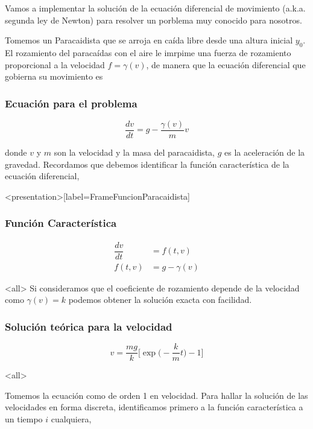 
Vamos a implementar la solución de la ecuación diferencial de movimiento 
(a.k.a. segunda ley de Newton) para resolver un porblema muy conocido para 
nosotros. 

Tomemos un Paracaidista que se arroja en caída libre desde una altura inicial $y_0$.
El rozamiento del paracaídas con el aire le imrpime una fuerza de rozamiento proporcional 
a la velocidad $f = \gamma (v)$, de manera que la ecuación diferencial que gobierna su movimiento es

\mode*

\begin{frame}[label=FrameEcuacionParacaidista]
  \frametitle<presentation>{Ecuación para el problema}
  \begin{equation}\label{EqnNewtonParac}
    \dfrac{ d v }{dt} = g - \dfrac{\gamma (v)}{m} v
  \end{equation}
\end{frame}

donde $v$ y $m$ son la velocidad y la masa del paracaidista, $g$ es la aceleración de la gravedad.
Recordamos que debemos identificar la función característica de la ecuación diferencial, 

\mode*
\begin{frame}<presentation>[label=FrameFuncionParacaidista]
  \frametitle{Función Característica}
  \begin{equation}
    \begin{aligned}
      \dfrac{d v}{d t} &= f(t, v) \\
      f(t, v) &= g - \gamma (v)
    \end{aligned}
  \end{equation}
\end{frame}

\mode<all>
Si consideramos que el coeficiente de rozamiento depende de la velocidad como $\gamma (v) = k $
podemos obtener la solución exacta con facilidad.

\mode*
\begin{frame}[label=FrameSolucionTeorica]
  \frametitle<presentation>{Solución teórica para la velocidad}
  \begin{equation}
    v = \frac{m g}{k} \Big[ \exp\Big( - \frac{k}{m} t \Big) -1 \Big]
  \end{equation}
\end{frame}

\mode<all>

Tomemos la ecuación como de orden 1 en velocidad. 
Para hallar la solución de las velocidades en forma discreta, 
identificamos primero a la función característica a un tiempo $i$ cualquiera,

